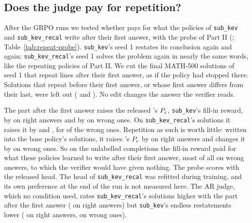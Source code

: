 \begin{table}[t]
\centering\small

\caption{The fill-in reward of unlabelled training completions that open with an informal draft minus that of the other
unlabelled completions of the same group with the same verdict (right or wrong), per 50-step window, mean over the
groups that hold both, in percentage points; -- where no group did.}
\label{tab:sub-draftfill}
\end{table}

\subsection{Does the judge pay for repetition?}\label{sec:res-repeat}

After the GRPO runs we tested whether \kev{} pays for what the policies of \texttt{sub\_kev} and
\texttt{sub\_kev\_recal} write after their first answer, with the probe of Part II (;
Table~\ref{tab:repeat-probe}). \texttt{sub\_kev}'s seed 1 restates its conclusion again and again;
\texttt{sub\_kev\_recal}'s seed 1 solves the problem again in nearly the same words, like the repeating policies of
Part II. We cut the final MATH-500 solutions of seed 1 that repeat lines after their first answer, as if the policy
had stopped there. Solutions that repeat before their first answer, or whose first answer differs from their last,
were left out ( and ). No edit changes the answer the verifier reads.

The part after the first answer raises the released \kev{}'s $P_{\mathrm{c}}$, \texttt{sub\_kev}'s fill-in reward, by
  on right answers and by
  on wrong ones. On
\texttt{sub\_kev\_recal}'s solutions it raises it by 
 and 
, for  of the wrong ones.
Repetition as such is worth little: written into the base policy's solutions, it raises \kev{}'s $P_{\mathrm{c}}$ by
 on right answers and changes it by  on wrong ones. So on the unlabelled
completions the fill-in reward paid for what these policies learned to write after their first answer, most of all on
wrong answers, to which the verifier would have given nothing. The probe scores with the released head. The head of
\texttt{sub\_kev\_recal} was refitted during training, and its own preference at the end of the run is not measured
here. The AR judge, which no condition used, rates \texttt{sub\_kev\_recal}'s solutions higher with the part after the
first answer ( on right answers) but \texttt{sub\_kev}'s endless restatements lower
( on right answers,  on wrong ones).

